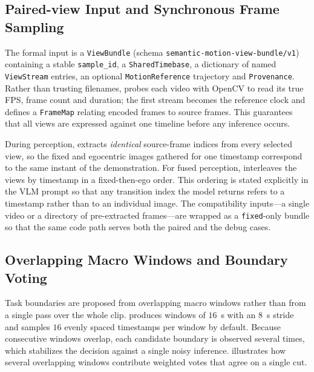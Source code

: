 \documentclass[11pt,oneside]{report}
\begin{document}
\subsection{Paired-view Input and Synchronous Frame Sampling}
The formal input is a \texttt{ViewBundle} (schema
\texttt{semantic-motion-view-bundle/v1}) containing a stable
\texttt{sample\_id}, a \texttt{SharedTimebase}, a dictionary of named
\texttt{ViewStream} entries, an optional \texttt{MotionReference} trajectory and
\texttt{Provenance}. Rather than trusting filenames, 
probes each video with OpenCV to read its true FPS, frame count and duration;
the first stream becomes the reference clock and defines a \texttt{FrameMap}
relating encoded frames to source frames. This guarantees that all views are
expressed against one timeline before any inference occurs.

During perception,  extracts \emph{identical}
source-frame indices from every selected view, so the fixed and egocentric
images gathered for one timestamp correspond to the same instant of the
demonstration. For fused perception,  interleaves
the views by timestamp in a fixed-then-ego order. This ordering is stated
explicitly in the VLM prompt so that any transition index the model returns
refers to a timestamp rather than to an individual image. The compatibility
inputs---a single video or a directory of pre-extracted frames---are wrapped as
a \texttt{fixed}-only bundle so that the same code path serves both the paired
and the debug cases.

\subsection{Overlapping Macro Windows and Boundary Voting}
Task boundaries are proposed from overlapping macro windows rather than from a
single pass over the whole clip.  produces
windows of $16$~s with an $8$~s stride and samples $16$ evenly spaced timestamps
per window by default. Because consecutive windows overlap, each candidate
boundary is observed several times, which stabilizes the decision against a
single noisy inference.  illustrates how several
overlapping windows contribute weighted votes that agree on a single cut.
\end{document}
